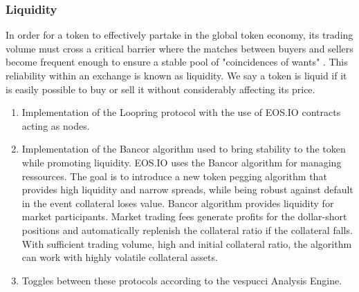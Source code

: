 \documentclass[]{article}
\begin{document}
	
	\subsubsection{Liquidity}
	In order for a token to effectively partake in the global token
	economy, its trading volume must cross a critical barrier where
	the matches between buyers and sellers become frequent enough to ensure a stable pool of "coincidences of wants" \cite{10}. 
	This reliability within an exchange is known as liquidity. We say a token is liquid if it is easily possible to buy or sell it without considerably affecting its price.
	
	\begin{enumerate} 
		\item Implementation of the Loopring protocol with the use of EOS.IO contracts acting as nodes.\cite{7}
		\item Implementation of the Bancor algorithm used to bring stability to the token while promoting liquidity.\cite{10}
		EOS.IO uses the Bancor algorithm  for managing ressources.
		The goal is to introduce a new token pegging algorithm that provides high liquidity and narrow spreads, while being robust against default in the event collateral loses value. Bancor algorithm provides liquidity for market participants. Market trading fees generate profits for the dollar-short positions and automatically replenish the collateral ratio if the collateral falls. With sufficient trading volume, high and initial collateral ratio, the algorithm can work with highly volatile collateral assets.\cite{25}
		\item Toggles between these protocols according to the vespucci Analysis Engine.
		\end{enumerate}
	
\end{document}
